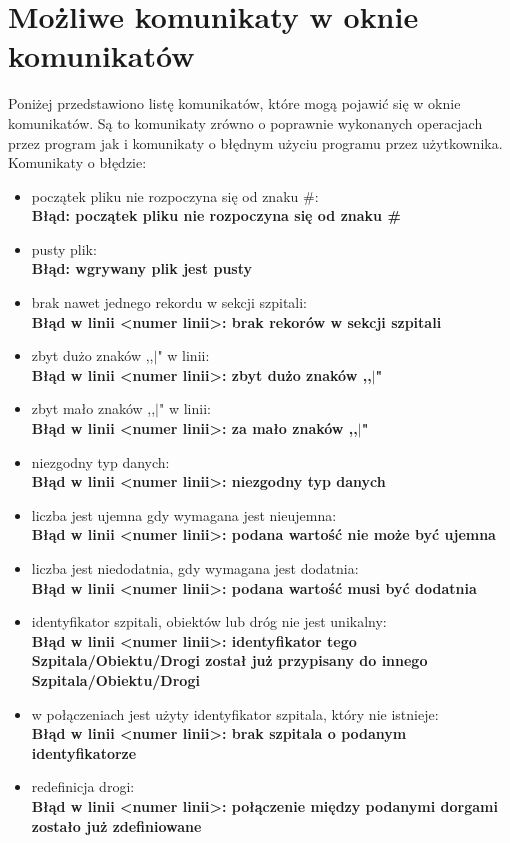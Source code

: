 \documentclass[10pt,a4paper]{article}
\begin{document}
\section{Możliwe komunikaty w oknie komunikatów}
Poniżej przedstawiono listę komunikatów, które mogą pojawić się w oknie komunikatów. Są to komunikaty zrówno o poprawnie wykonanych operacjach przez program jak i komunikaty o błędnym użyciu programu przez użytkownika. Komunikaty o błędzie:
\begin{itemize}
\item początek pliku nie rozpoczyna się od znaku \#: \\ \textbf{Błąd: początek pliku nie rozpoczyna się od znaku \#}
\item pusty plik: \\ \textbf{Błąd: wgrywany plik jest pusty}
\item brak nawet jednego rekordu w sekcji szpitali: \\ \textbf{Błąd w linii \textless numer linii\textgreater: brak rekorów w sekcji szpitali}
\item zbyt dużo znaków ,,$\mid$" w linii: \\ \textbf{Błąd w linii \textless numer linii\textgreater: zbyt dużo znaków ,,$\mid$"}
\item zbyt mało znaków ,,$\mid$" w linii: \\ \textbf{Błąd w linii  \textless numer linii\textgreater: za mało znaków ,,$\mid$"}
\item niezgodny typ danych: \\ \textbf{Błąd w linii  \textless numer linii\textgreater: niezgodny typ danych}
\item liczba jest ujemna gdy wymagana jest nieujemna: \\ \textbf{Błąd w linii  \textless numer linii\textgreater: podana wartość nie może być ujemna}
\item liczba jest niedodatnia, gdy wymagana jest dodatnia: \\ \textbf{Błąd w linii \textless numer linii\textgreater: podana wartość musi być dodatnia}
\item identyfikator szpitali, obiektów lub dróg nie jest unikalny: \\ \textbf{Błąd w linii  \textless numer linii\textgreater : identyfikator tego Szpitala/Obiektu/Drogi został już przypisany do innego Szpitala/Obiektu/Drogi}
\item w połączeniach jest użyty identyfikator szpitala, który nie istnieje: \\ \textbf{Błąd w linii  \textless numer linii\textgreater: brak szpitala o podanym identyfikatorze}
\item redefinicja drogi: \\ \textbf{Błąd w linii \textless numer linii\textgreater : połączenie między podanymi dorgami zostało już zdefiniowane}
\end{itemize}
\end{document}
